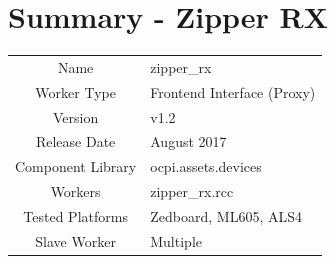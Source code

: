 \documentclass{article}
\author{} %
\date{Version \docVersion} %
\title{\docTitle}
\def\docVersion{1.2}
\def\comp{zipper\_rx}
\def\Comp{Zipper RX}
\begin{document}
\section*{Summary - \Comp}
\begin{tabular}{|c|M{13.5cm}|}
	\hline
	                  &                                        \\
	\hline
	Name              & \comp                                  \\
	\hline
	Worker Type       & Frontend Interface (Proxy)             \\
	\hline
	Version           & v\docVersion \\
	\hline
	Release Date      & August 2017 \\
	\hline
	Component Library & ocpi.assets.devices \\
	\hline
	Workers           & zipper\_rx.rcc                      \\
	\hline
	Tested Platforms  & Zedboard, ML605, ALS4                      \\
	\hline
	Slave Worker      & Multiple                               \\
	\hline
\end{tabular}
\end{document}
